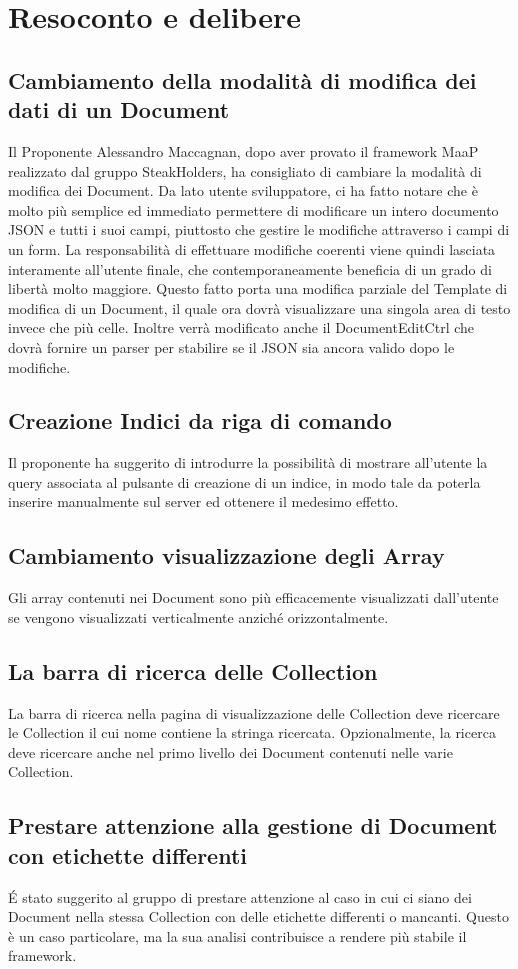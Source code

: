 \newpage
\section{Resoconto e delibere}
\label{2}

\subsection{Cambiamento della modalità di modifica dei dati di un Document}
Il Proponente Alessandro Maccagnan, dopo aver provato il framework MaaP realizzato dal gruppo SteakHolders, 
ha consigliato di cambiare la modalità di modifica dei Document.
Da lato utente sviluppatore, ci ha fatto notare che è molto più semplice ed immediato permettere di modificare un intero documento 
JSON e tutti i suoi campi, piuttosto che gestire le modifiche attraverso i campi di un form. 
La responsabilità di effettuare modifiche coerenti viene quindi lasciata interamente all'utente finale, che contemporaneamente beneficia di un grado di libertà molto maggiore.
Questo fatto porta una modifica parziale del Template di modifica di un Document, il quale ora dovrà visualizzare una singola
area di testo invece che più celle. Inoltre verrà modificato anche il DocumentEditCtrl che dovrà fornire un parser per stabilire 
se il JSON sia ancora valido dopo le modifiche.

\subsection{Creazione Indici da riga di comando}
Il proponente ha suggerito di introdurre la possibilità di mostrare all'utente la query associata al pulsante di creazione di un indice, in modo tale da poterla inserire manualmente sul server ed ottenere il medesimo effetto.

\subsection{Cambiamento visualizzazione degli Array}
Gli array contenuti nei Document sono più efficacemente visualizzati dall'utente se vengono visualizzati verticalmente
anziché orizzontalmente.

\subsection{La barra di ricerca delle Collection}
La barra di ricerca nella pagina di visualizzazione delle Collection deve ricercare le Collection il cui nome contiene la stringa ricercata.
Opzionalmente, la ricerca deve ricercare anche nel primo livello dei Document contenuti nelle varie Collection. 

\subsection{Prestare attenzione alla gestione di Document con etichette differenti}
\'{E} stato suggerito al gruppo di prestare attenzione al caso in cui ci siano dei Document nella stessa Collection con delle etichette 
differenti o mancanti. Questo è un caso particolare, ma la sua analisi contribuisce a rendere più stabile il framework.

